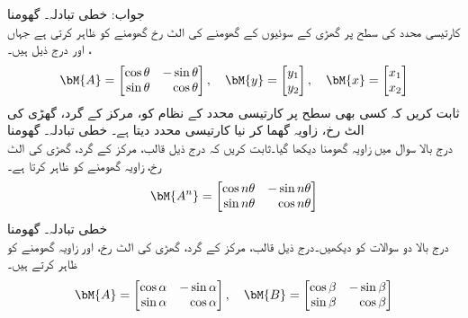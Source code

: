 جواب: 
\quad خطی تبادلہ۔ گھومنا\\
کارتیسی محدد کی  سطح پر گھڑی کے سوئیوں کے گھومنے کی الٹ رخ گھومنے کو  ظاہر کرتی ہے جہاں ،  اور  درج ذیل ہیں۔
\begin{align*}
\bM{A}=\begin{bmatrix*}[r] \cos \theta&-\sin \theta\\ \sin \theta & \cos \theta \end{bmatrix*}, \quad \bM{y}=\begin{bmatrix} y_1\\ y_2 \end{bmatrix},\quad \bM{x}=\begin{bmatrix}x_1 \\ x_2  \end{bmatrix}
\end{align*}
ثابت کریں کہ  کسی بھی سطح پر  کارتیسی محدد کے نظام کو، مرکز کے گرد،  گھڑی کی الٹ رخ،   زاویہ گھما کر نیا کارتیسی محدد  دیتا ہے۔
\quad خطی تبادلہ۔ گھومنا\\
درج بالا سوال میں  زاویہ گھومنا دیکھا گیا۔ثابت کریں کہ درج ذیل قالب، مرکز کے گرد، گھڑی کی الٹ رخ،   زاویہ گھومنے کو ظاہر کرتا ہے۔ 
\begin{align*}
\bM{A^n}=\begin{bmatrix*}[r] \cos n\theta&-\sin n\theta\\ \sin n\theta & \cos n\theta \end{bmatrix*}
\end{align*}
\quad خطی تبادلہ۔ گھومنا\\
درج بالا دو سوالات کو دیکھیں۔درج ذیل قالب، مرکز کے گرد، گھڑی کی الٹ رخ،  اور  زاویہ گھومنے کو ظاہر کرتے ہیں۔
\begin{align*}
\bM{A}=\begin{bmatrix*}[r] \cos \alpha&-\sin \alpha\\ \sin \alpha & \cos \alpha \end{bmatrix*}, \quad \bM{B}=\begin{bmatrix*}[r] \cos \beta&-\sin \beta\\ \sin \beta & \cos \beta \end{bmatrix*}
\end{align*}
